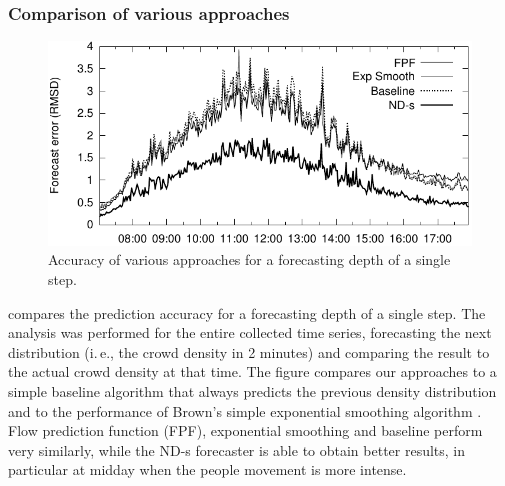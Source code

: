 \documentclass[12pt,a4paper,twoside,openright]{book}
\begin{document}
\subsubsection{Comparison of various approaches}

\begin{figure}
    \centering
    \includegraphics[width=0.9\columnwidth]{img/1step}
    \caption{Accuracy of various approaches for a forecasting depth of a single step.}
    \label{fig:pred_1}
\end{figure}

 compares the prediction accuracy for a forecasting depth of a single step.
%
The analysis was performed for the entire collected time series, forecasting the next distribution (i.\,e., the crowd density in 2 minutes) and comparing the result to the actual crowd density at that time.
%
The figure compares our approaches to a simple baseline algorithm that always predicts the previous density distribution and to the performance of Brown's simple exponential smoothing algorithm \cite{brown2004}.
%
Flow prediction function (FPF), exponential smoothing and baseline perform very similarly, while the ND-s forecaster is able to obtain better results, in particular at midday when the people movement is more intense.
\end{document}

